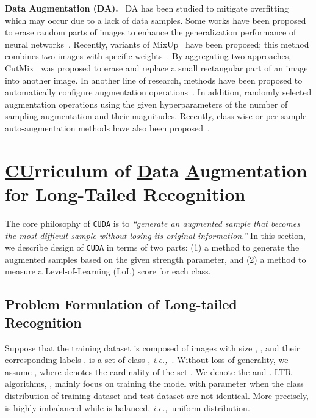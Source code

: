 \documentclass{article}
\newcommand{\ie}{\emph{i.e.,~}}
\newcommand{\myparagraph}[1]{\vspace{0.07cm}\noindent\textbf{#1}~}
\def\code#1{\texttt{#1}}
\newcommand{\alg}{\code{CUDA}\xspace}
\renewcommand*\cite[1]{\citep{#1}}
\begin{document}
\myparagraph{Data Augmentation (DA).} DA has been studied to mitigate overfitting which may occur due to a lack of data samples. 
Some works have been proposed to erase random parts of images to enhance the generalization performance of neural networks~\cite{devries2017improved, zhong2020random, kumar2017hide, choe2019attention}. Recently, variants of MixUp~\citep{zhang2017mixup} have been proposed; this method combines two images with specific weights~\citep{tokozume2018between, guo2019mixup, takahashi2018ricap, devries2017improved, verma2019manifold}. By aggregating two approaches, CutMix~\citep{yun2019cutmix} was proposed to erase and replace a small rectangular part of an image into another image.
In another line of research, methods have been proposed to automatically configure augmentation operations~\cite{cubuk2019autoaugment, lim2019fast, li2020dada, hataya2020faster, gudovskiy2021autodo}. In addition, \citet{cubuk2020randaugment} randomly selected augmentation operations using the given hyperparameters of the number of sampling augmentation and their magnitudes. Recently, class-wise or per-sample auto-augmentation methods have also been proposed~\cite{cheung2021adaaug, rommel2021cadda}. \section{\textbf{\underline{CU}}rriculum of \textbf{\underline{D}}ata \textbf{\underline{A}}ugmentation for Long-Tailed Recognition}
\label{sec:method}
\vspace{-10pt}


The core philosophy of \alg is to \emph{``generate an augmented sample that becomes the most difficult sample without losing its original information.''} In this section, we describe design of \alg in terms of two parts: (1) a method to generate the augmented samples based on the given strength parameter, and (2) a method to measure a Level-of-Learning (LoL) score for each class.


\subsection{Problem Formulation of Long-tailed Recognition}


Suppose that the training dataset  is composed of images with size , , and their corresponding labels .  is a set of class , \ie . Without loss of generality, we assume , where  denotes the cardinality of the set . We denote the  and . LTR algorithms, , mainly focus on training the model  with parameter  when the class distribution of training dataset  and test dataset  are not identical. More precisely,  is highly imbalanced while  is balanced, \ie uniform distribution.
\end{document}
